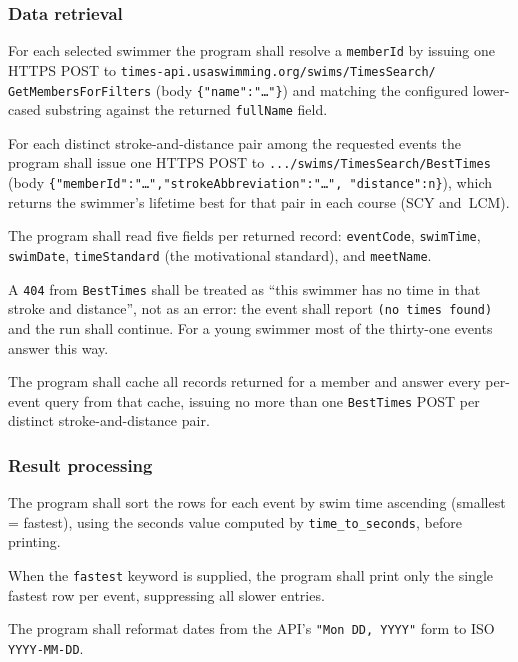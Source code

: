 \documentclass[12pt]{article}
\newcommand{\code}[1]{\texttt{#1}}
\newcommand{\req}[1]{\textbf{[#1]}}
\begin{document}
\subsubsection{Data retrieval}

\begin{description}[style=nextline]
  \item[\req{REQ-F-30}] For each selected swimmer the program
        shall resolve a \code{memberId} by issuing one HTTPS POST
        to \code{times-api.usaswimming.org/swims/TimesSearch/%
        GetMembersForFilters} (body \code{\{"name":"\dots"\}}) and
        matching the configured lower-cased substring against the
        returned \code{fullName} field.
  \item[\req{REQ-F-31}] For each distinct stroke-and-distance pair
        among the requested events the program shall issue one HTTPS
        POST to \code{.../swims/TimesSearch/BestTimes} (body
        \code{\{"memberId":"\dots","strokeAbbreviation":"\dots",%
        "distance":n\}}), which returns the swimmer's lifetime best
        for that pair in each course (SCY and~LCM).
  \item[\req{REQ-F-32}] The program shall read five fields per
        returned record: \code{eventCode}, \code{swimTime},
        \code{swimDate}, \code{timeStandard} (the motivational
        standard), and \code{meetName}.
  \item[\req{REQ-F-34}] A \code{404} from \code{BestTimes} shall be
        treated as ``this swimmer has no time in that stroke and
        distance'', not as an error: the event shall report
        \code{(no times found)} and the run shall continue.  For a
        young swimmer most of the thirty-one events answer this way.
  \item[\req{REQ-F-33}] The program shall cache all records returned
        for a member and answer every per-event query from that cache,
        issuing no more than one \code{BestTimes} POST per distinct
        stroke-and-distance pair.
\end{description}

\subsubsection{Result processing}

\begin{description}[style=nextline]
  \item[\req{REQ-F-40}] The program shall sort the rows for each
        event by swim time ascending (smallest = fastest), using the
        seconds value computed by \code{time\_to\_seconds}, before
        printing.
  \item[\req{REQ-F-41}] When the \code{fastest} keyword is supplied,
        the program shall print only the single fastest row per
        event, suppressing all slower entries.
  \item[\req{REQ-F-42}] The program shall reformat dates from the
        API's \code{"Mon DD, YYYY"} form to ISO \code{YYYY-MM-DD}.
\end{description}
\end{document}

